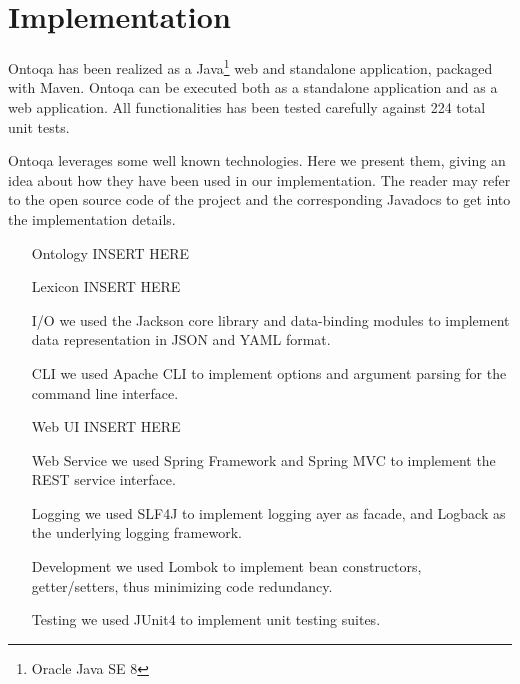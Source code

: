 \section{Implementation}
\label{sec:implementation}

Ontoqa has been realized as a Java\footnote{Oracle Java SE 8} web and standalone application, packaged with Maven.
%
Ontoqa can be executed both as a standalone application and as a web application.
%
All functionalities has been tested carefully against 224 total unit tests.

Ontoqa leverages some well known technologies. Here we present them, giving an idea about how they have been used in our implementation. The reader may refer to the open source code of the project and the corresponding Javadocs to get into the implementation details.


\begin{itemize}
	\item[Ontology] INSERT HERE
	
	\item[Lexicon] INSERT HERE	
	
	\item[I/O] we used the Jackson core library and data-binding modules to implement data representation in JSON and YAML format.
	
	\item[CLI] we used Apache CLI to implement options and argument parsing for the command line interface.
	
	\item[Web UI] INSERT HERE
	
	\item[Web Service] we used Spring Framework and Spring MVC to implement the REST service interface.
	
	\item[Logging] we used SLF4J to implement logging ayer as facade, and Logback as the underlying logging framework.
	
	\item[Development] we used Lombok to implement bean constructors, getter/setters, thus minimizing code redundancy.
	
	\item[Testing] we used JUnit4 to implement unit testing suites.
\end{itemize}